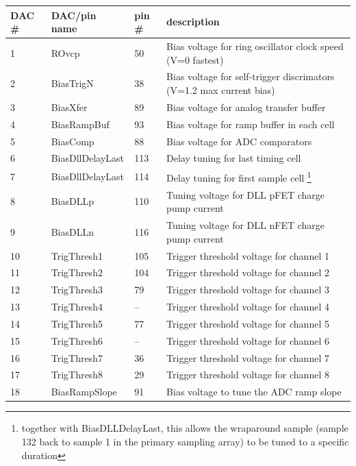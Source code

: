 \documentclass[12pt]{article}
\begin{document}
\begin{center}
\begin{longtable}[h!]{|l|l|l| p{10.5cm}|}
  \hline
  DAC \# & DAC/pin name & pin \# & description\\ \hline \hline
  1 & ROvcp & 50 & Bias voltage for ring oscillator clock speed (V=0 fastest) \\ \hline
  2 & BiasTrigN & 38 & Bias voltage for self-trigger discrimators (V=1.2 max current bias) \\ \hline
  3 & BiasXfer & 89 & Bias voltage for analog transfer buffer \\ \hline
  4 & BiasRampBuf & 93 & Bias voltage for ramp buffer in each cell \\ \hline
  5 & BiasComp & 88 & Bias voltage for ADC comparators \\ \hline
  6 & BiasDllDelayLast & 113 & Delay tuning for last timing cell \\ \hline
  7 & BiasDllDelayLast & 114 & Delay tuning for first sample cell \footnote{together with BiasDLLDelayLast, this allows the wraparound sample (sample 132 back to sample 1 in the primary sampling array) to be tuned to a specific duration} \\ \hline
  8 & BiasDLLp & 110 & Tuning voltage for DLL pFET charge pump current \\ \hline
  9 & BiasDLLn & 116 & Tuning voltage for DLL nFET charge pump current \\ \hline
  10 & TrigThresh1 & 105 & Trigger threshold voltage for channel 1 \\ \hline
  11 & TrigThresh2 & 104 & Trigger threshold voltage for channel 2 \\ \hline
  12 & TrigThresh3 & 79  & Trigger threshold voltage for channel 3 \\ \hline
  13 & TrigThresh4 & -- & Trigger threshold voltage for channel 4 \\ \hline
  14 & TrigThresh5 & 77  & Trigger threshold voltage for channel 5 \\ \hline
  15 & TrigThresh6 & -- & Trigger threshold voltage for channel 6 \\ \hline
  16 & TrigThresh7 & 36  & Trigger threshold voltage for channel 7 \\ \hline
  17 & TrigThresh8 & 29  & Trigger threshold voltage for channel 8 \\ \hline
  18 & BiasRampSlope & 91 & Bias voltage to tune the ADC ramp slope \\ \hline
\end{longtable}
\end{center}
   
\end{document}
